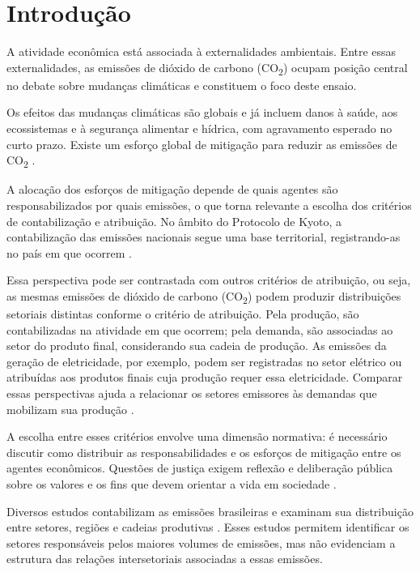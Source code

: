 \section{Introdução}

A atividade econômica está associada à externalidades ambientais. Entre essas externalidades, as emissões de dióxido de carbono (CO\textsubscript{2}) ocupam posição central no debate sobre mudanças climáticas e constituem o foco deste ensaio.

Os efeitos das mudanças climáticas são globais e já incluem danos à saúde, aos ecossistemas e à segurança alimentar e hídrica, com agravamento esperado no curto prazo. Existe um  esforço global de mitigação para reduzir as emissões de CO\textsubscript{2} \parencite{ipcc2023spm}.

A alocação dos esforços de mitigação depende de quais agentes são responsabilizados por quais emissões, o que torna relevante a escolha dos critérios de contabilização e atribuição. No âmbito do Protocolo de Kyoto, a contabilização das emissões nacionais segue uma base territorial, registrando-as no país em que ocorrem \parencite{unfccc2008kyotoManual}.

Essa perspectiva pode ser contrastada com outros critérios de atribuição, ou seja, as mesmas emissões de dióxido de carbono (CO\textsubscript{2}) podem produzir distribuições setoriais distintas conforme o critério de atribuição. Pela produção, são contabilizadas na atividade em que ocorrem; pela demanda, são associadas ao setor do produto final, considerando sua cadeia de produção. As emissões da geração de eletricidade, por exemplo, podem ser registradas no setor elétrico ou atribuídas aos produtos finais cuja produção requer essa eletricidade. Comparar essas perspectivas ajuda a relacionar os setores emissores às demandas que mobilizam sua produção \parencite{marques2012,millerBlair2009}.

A escolha entre esses critérios envolve uma dimensão normativa: é necessário discutir como distribuir as responsabilidades e os esforços de mitigação entre os agentes econômicos. Questões de justiça exigem reflexão e deliberação pública sobre os valores e os fins que devem orientar a vida em sociedade \parencite{sandel2015justica}.

Diversos estudos contabilizam as emissões brasileiras e examinam sua distribuição entre setores, regiões e cadeias produtivas \parencite{imori2015,sanguinetAzzoni2024,montoyaEtAl2026}. Esses estudos permitem identificar os setores responsáveis pelos maiores volumes de emissões, mas não evidenciam a estrutura das relações intersetoriais associadas a essas emissões.

